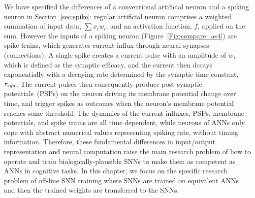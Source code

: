 	We have specified the differences of a conventional artificial neuron and a spiking neuron in Section~\ref{sec:spike}: regular artificial neuron comprises a weighted summation of input data, $\sum x_i w_i$, and an activation function, $f$, applied on the sum.
	However the inputs of a spiking neuron (Figure~\ref{Fig:compare_as4}) are spike trains, which generates current influx through neural synapses (connections).
	A single spike creates a current pulse with an amplitude of $w$, which is defined as the synaptic efficacy, and the current then decays exponentially with a decaying rate determined by the synaptic time constant, $\tau_{\textit{\textrm{syn}}}$.
	The current pulses then consequently produce post-synaptic potentials~(PSPs) on the neuron driving its membrane potential change over time, and trigger spikes as outcomes when the neuron's membrane potential reaches some threshold.
	The dynamics of the current influxes, PSPs, membrane potentials, and spike trains are all time dependent, while neurons of ANNs only cope with abstract numerical values representing spiking rate, without timing information.
	Therefore, these fundamental differences in input/output representation and neural computation raise the main research problem of how to operate and train biologically-plausible SNNs to make them as competent as ANNs in cognitive tasks.
	In this chapter, we focus on the specific research problem of off-line SNN training where SNNs are trained on equivalent ANNs and then the trained weights are transferred to the SNNs.
	
